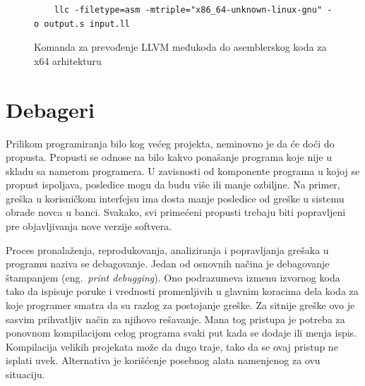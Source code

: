 \documentclass[12pt,oneside]{memoir}
\begin{document}
\begin{figure}[!ht]
  \begin{verbatim}
    llc -filetype=asm -mtriple="x86_64-unknown-linux-gnu" -o output.s input.ll
  \end{verbatim}
  \caption{Komanda za prevođenje LLVM međukoda do asemblerskog koda za x64 arhitekturu}
  \label{lst:llc_command}
\end{figure}


\chapter{Debageri}
\label{sec:debuggers}


Prilikom programiranja bilo kog većeg projekta, neminovno je da će doći do propusta.
Propusti se odnose na bilo kakvo ponašanje programa koje nije u skladu sa namerom programera.
U zavisnosti od komponente programa u kojoj se propust ispoljava, posledice mogu da budu više ili manje ozbiljne.
Na primer, greška u korisničkom interfejsu ima dosta manje posledice od greške u sistemu obrade novca u banci.
Svakako, svi primećeni propusti trebaju biti popravljeni pre objavljivanja nove verzije softvera.

Proces pronalaženja, reprodukovanja, analiziranja i popravljanja grešaka u programu naziva se debagovanje.
Jedan od osnovnih načina je debagovanje štampanjem (eng.~{\em print debugging}).
Ono podrazumeva izmenu izvornog koda tako da ispisuje poruke i vrednosti promenljivih u glavnim koracima dela koda za koje programer smatra da su razlog za postojanje greške.
Za sitnije greške ovo je sasvim prihvatljiv način za njihovo rešavanje.
Mana tog pristupa je potreba za ponovnom kompilacijom celog programa svaki put kada se dodaje ili menja ispis.
Kompilacija velikih projekata može da dugo traje, tako da se ovaj pristup ne isplati uvek.
Alternativa je korišćenje posebnog alata namenjenog za ovu situaciju.
\end{document}

